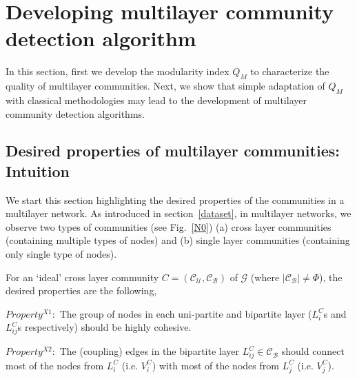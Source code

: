\section{Developing multilayer community detection algorithm}
\label{metric}
In this section, first we develop the modularity index $Q_M$ to characterize the quality of multilayer communities. Next, we show
that simple adaptation of $Q_M$ with classical methodologies may lead to the development of multilayer community detection algorithms.



\subsection{Desired properties of multilayer communities: Intuition}\label{prop}
We start this section highlighting the desired properties of the communities in a multilayer network.
As introduced in section~\ref{dataset}, in multilayer networks, we observe two types of communities (see Fig.~\ref{N0})
(a) cross layer communities (containing multiple types of nodes) and
(b) single layer communities (containing only single type of nodes).

For an `ideal' cross layer community $C = (\mathcal{C_U},\mathcal{C_B})$ of $\mathcal{G}$
(where $\left \vert \mathcal{C_B} \right \vert \neq \Phi$), the desired properties are the following,

\textbf{$Property^{X1}:$} The group of nodes in each uni-partite and bipartite layer ($L^C_i$s and $L^C_{ij}$s respectively) should 
be highly cohesive.

\textbf{$Property^{X2}:$} The (coupling) edges in the bipartite layer $L^C_{ij} \in \mathcal{C_B}$ should connect most of the nodes
from $L^C_i$ (i.e. $V^C_i$) with most of the nodes from $L^C_j$ (i.e. $V^C_j$).

